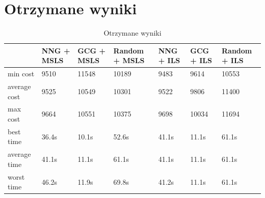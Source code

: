 \documentclass[a4paper 10pt]{article}
\begin{document}
\newpage
\section{Otrzymane wyniki}
\begin{table}[H]
\centering
\caption{Otrzymane wyniki}
\label{my-label}
\begin{tabular}{|l|l|l|l|l|l|l|}
\hline
             & NNG + MSLS & GCG + MSLS & Random + MSLS & NNG + ILS & GCG + ILS & Random + ILS \\ \hline
min cost     & 9510 & 11548 & 10189 & 9483 & 9614 & 10553 \\ \hline
average cost & 9525 & 10549 & 10301 & 9522 & 9806 & 11400 \\ \hline
max cost     & 9664 & 10551 & 10375 & 9698 & 10034 & 11694 \\ \hline
best time    & 36.4s & 10.1s & 52.6s & 41.1s & 11.1s & 61.1s \\ \hline
average time & 41.1s & 11.1s & 61.1s & 41.1s & 11.1s & 61.1s \\ \hline
worst time   & 46.2s & 11.9s & 69.8s & 41.2s & 11.1s & 61.1s \\ \hline 
\end{tabular}
\end{table}
\end{document}
